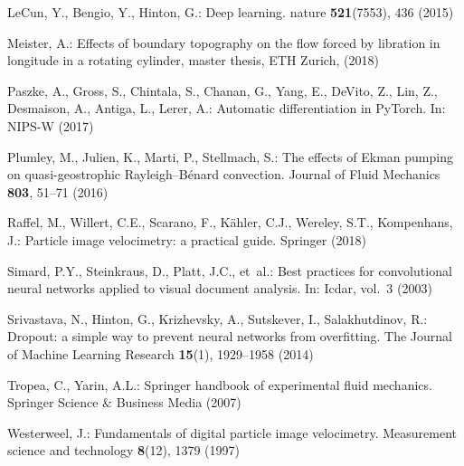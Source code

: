 \documentclass{svjour3}                     %
\begin{document}
\begin{thebibliography}{17}
LeCun, Y., Bengio, Y., Hinton, G.: Deep learning.
\newblock nature \textbf{521}(7553), 436 (2015)

Meister, A.: Effects of boundary topography on the flow forced by libration in
  longitude in a rotating cylinder, master thesis, ETH Zurich, (2018)

Paszke, A., Gross, S., Chintala, S., Chanan, G., Yang, E., DeVito, Z., Lin, Z.,
  Desmaison, A., Antiga, L., Lerer, A.: Automatic differentiation in
  {P}y{T}orch.
\newblock In: NIPS-W (2017)

Plumley, M., Julien, K., Marti, P., Stellmach, S.: The effects of {E}kman
  pumping on quasi-geostrophic {R}ayleigh--{B}{\'e}nard convection.
\newblock Journal of Fluid Mechanics \textbf{803}, 51--71 (2016)

Raffel, M., Willert, C.E., Scarano, F., K{\"a}hler, C.J., Wereley, S.T.,
  Kompenhans, J.: Particle image velocimetry: a practical guide.
\newblock Springer (2018)

Simard, P.Y., Steinkraus, D., Platt, J.C., et~al.: Best practices for
  convolutional neural networks applied to visual document analysis.
\newblock In: Icdar, vol.~3 (2003)

Srivastava, N., Hinton, G., Krizhevsky, A., Sutskever, I., Salakhutdinov, R.:
  Dropout: a simple way to prevent neural networks from overfitting.
\newblock The Journal of Machine Learning Research \textbf{15}(1), 1929--1958
  (2014)

Tropea, C., Yarin, A.L.: Springer handbook of experimental fluid mechanics.
\newblock Springer Science \& Business Media (2007)

Westerweel, J.: Fundamentals of digital particle image velocimetry.
\newblock Measurement science and technology \textbf{8}(12), 1379 (1997)

\end{thebibliography}
\end{document}
